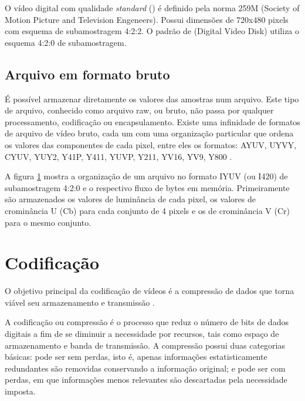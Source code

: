 
O vídeo digital com qualidade \emph{standard} () é definido pela norma  259M (Society of Motion Picture and Television Engeneers). Possui dimensões de 720x480 pixels com esquema de subamostragem 4:2:2. O padrão de  (Digital Video Disk) utiliza o esquema 4:2:0 de subamostragem.

\subsection{Arquivo em formato bruto}

É possível armazenar diretamente os valores das amostras num arquivo. Este tipo de arquivo, conhecido como arquivo raw, ou bruto, não passa por qualquer processamento, codificação ou encapsulamento. Existe uma infinidade de formatos de arquivo de vídeo bruto, cada um com uma organização particular que ordena os valores das componentes de cada pixel, entre eles os formatos: AYUV, UYVY, CYUV, YUY2, Y41P, Y411, YUVP, Y211, YV16, YV9, Y800 \cite{fourccyuv}. %

A figura \ref{} mostra a organização de um arquivo no formato IYUV (ou I420) de subamostragem 4:2:0 e o respectivo fluxo de bytes em memória. Primeiramente são armazenados os valores de luminância de cada pixel, os valores de crominância U (Cb) para cada conjunto de 4 pixels e os de crominância V (Cr) para o mesmo conjunto.


\section{Codificação}

O objetivo principal da codificação de vídeos é a compressão de dados que torna viável seu armazenamento e transmissão \cite{daronco}.

A codificação ou compressão é o processo que reduz o número de bits de dados digitais a fim de se diminuir a necessidade por recursos, tais como espaço de armazenamento e banda de transmissão. A compressão possui duas categorias básicas: pode ser sem perdas, isto é, apenas informações estatisticamente redundantes são removidas conservando a informação original; e pode ser com perdas, em que informações menos relevantes são descartadas pela necessidade imposta.

